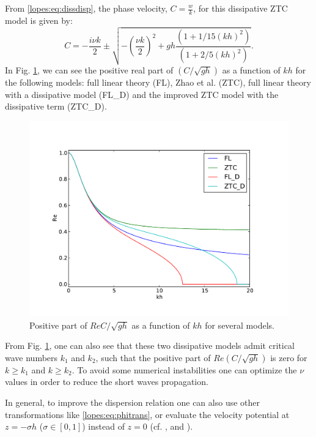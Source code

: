 From \eqref{lopes:eq:dissdisp}, the
 phase velocity, \(\displaystyle C=\frac{w}{k}\),  for this dissipative ZTC model is
 given by:
\begin{equation}
C=-\frac{i\nu k}{2}\pm\sqrt{-\left(\frac{\nu k}{2}\right)^2+gh\frac{(1+1/15(kh)^2)}{(1+2/5(kh)^2)}}.
\end{equation}
In Fig. \ref{lopes:fig:dispersion}, we can see the positive real
part
of \(\displaystyle\left(C/\sqrt{gh}\right)\) as a function of \(kh\) for the following models:
  full linear theory (FL),
Zhao et al. (ZTC), full linear theory with a
dissipative model (FL\_D) and the
improved  ZTC model with the dissipative term (ZTC\_D).
\begin{figure}[htb]
  \begin{center}
    \includegraphics[width=\largefig]{chapters/lopes/pdf/dispersion.pdf}
    \caption{Positive  part of $Re C/ \sqrt{gh}$ as a function of $kh$ for several models.}
    \label{lopes:fig:dispersion}
  \end{center}
\end{figure}
From Fig. \ref{lopes:fig:dispersion}, one can also see that
  these two dissipative models  admit
critical wave numbers \(k_1\) and \(k_2\),
such that the positive  part of \(\displaystyle Re\left(C/\sqrt{gh}\right)\) is zero
for \(k\geq k_1\) and \(k\geq k_2\).
To avoid some numerical instabilities one can optimize
 the \(\nu\) values in order
 to reduce  the short waves propagation.


In general, to improve the dispersion relation one can also use other
 transformations like \eqref{lopes:eq:phitrans}, or evaluate the
 velocity potential at \(z=-\sigma h\) (\(\sigma\in[0,1]\))
 instead of  \(z=0\) (cf. \cite{BinghamMadsenFuhrman2008}, \cite{MadsenAgnon2003} and \cite{MadsenBinghamSchaffer2003}).

